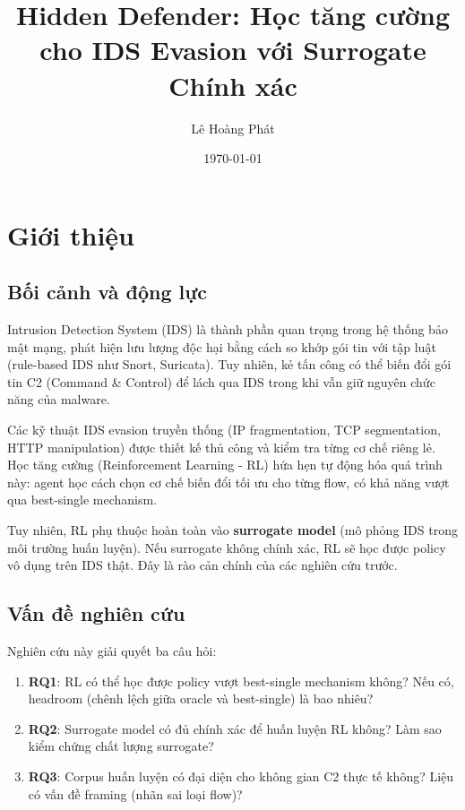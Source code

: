 \documentclass[12pt, a4paper, openany]{book}
\title{Hidden Defender: Học tăng cường cho IDS Evasion với Surrogate Chính xác}
\author{Lê Hoàng Phát}
\date{\today}
\begin{document}
\maketitle
\tableofcontents

\chapter{Giới thiệu}

\section{Bối cảnh và động lực}

Intrusion Detection System (IDS) là thành phần quan trọng trong hệ thống bảo mật mạng, phát hiện lưu lượng độc hại bằng cách so khớp gói tin với tập luật (rule-based IDS như Snort, Suricata). Tuy nhiên, kẻ tấn công có thể biến đổi gói tin C2 (Command \& Control) để lách qua IDS trong khi vẫn giữ nguyên chức năng của malware.

Các kỹ thuật IDS evasion truyền thống (IP fragmentation, TCP segmentation, HTTP manipulation) được thiết kế thủ công và kiểm tra từng cơ chế riêng lẻ. Học tăng cường (Reinforcement Learning - RL) hứa hẹn tự động hóa quá trình này: agent học cách chọn cơ chế biến đổi tối ưu cho từng flow, có khả năng vượt qua best-single mechanism.

Tuy nhiên, RL phụ thuộc hoàn toàn vào \textbf{surrogate model} (mô phỏng IDS trong môi trường huấn luyện). Nếu surrogate không chính xác, RL sẽ học được policy vô dụng trên IDS thật. Đây là rào cản chính của các nghiên cứu trước.

\section{Vấn đề nghiên cứu}

Nghiên cứu này giải quyết ba câu hỏi:

\begin{enumerate}
    \item \textbf{RQ1}: RL có thể học được policy vượt best-single mechanism không? Nếu có, headroom (chênh lệch giữa oracle và best-single) là bao nhiêu?
    
    \item \textbf{RQ2}: Surrogate model có đủ chính xác để huấn luyện RL không? Làm sao kiểm chứng chất lượng surrogate?
    
    \item \textbf{RQ3}: Corpus huấn luyện có đại diện cho không gian C2 thực tế không? Liệu có vấn đề framing (nhãn sai loại flow)?
\end{enumerate}
\end{document}

